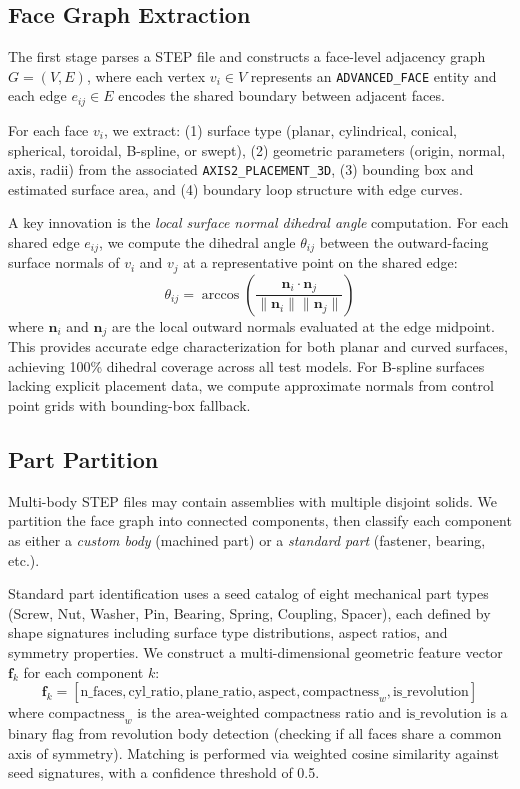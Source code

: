 \documentclass{styles/svproc}
\begin{document}
\subsection{Face Graph Extraction}
\label{sec:face_graph}
The first stage parses a STEP file and constructs a face-level adjacency graph $G = (V, E)$, where each vertex $v_i \in V$ represents an \texttt{ADVANCED\_FACE} entity and each edge $e_{ij} \in E$ encodes the shared boundary between adjacent faces.

For each face $v_i$, we extract: (1) surface type (planar, cylindrical, conical, spherical, toroidal, B-spline, or swept), (2) geometric parameters (origin, normal, axis, radii) from the associated \texttt{AXIS2\_PLACEMENT\_3D}, (3) bounding box and estimated surface area, and (4) boundary loop structure with edge curves.

A key innovation is the \emph{local surface normal dihedral angle} computation. For each shared edge $e_{ij}$, we compute the dihedral angle $\theta_{ij}$ between the outward-facing surface normals of $v_i$ and $v_j$ at a representative point on the shared edge:
\begin{equation}
\theta_{ij} = \arccos\left(\frac{\mathbf{n}_i \cdot \mathbf{n}_j}{\|\mathbf{n}_i\| \|\mathbf{n}_j\|}\right)
\label{eq:dihedral}
\end{equation}
where $\mathbf{n}_i$ and $\mathbf{n}_j$ are the local outward normals evaluated at the edge midpoint. This provides accurate edge characterization for both planar and curved surfaces, achieving 100\% dihedral coverage across all test models. For B-spline surfaces lacking explicit placement data, we compute approximate normals from control point grids with bounding-box fallback.

\subsection{Part Partition}
\label{sec:partition}
Multi-body STEP files may contain assemblies with multiple disjoint solids. We partition the face graph into connected components, then classify each component as either a \emph{custom body} (machined part) or a \emph{standard part} (fastener, bearing, etc.).

Standard part identification uses a seed catalog of eight mechanical part types (Screw, Nut, Washer, Pin, Bearing, Spring, Coupling, Spacer), each defined by shape signatures including surface type distributions, aspect ratios, and symmetry properties. We construct a multi-dimensional geometric feature vector $\mathbf{f}_k$ for each component $k$:
\begin{equation}
\mathbf{f}_k = [\text{n\_faces}, \text{cyl\_ratio}, \text{plane\_ratio}, \text{aspect}, \text{compactness}_w, \text{is\_revolution}]
\end{equation}
where $\text{compactness}_w$ is the area-weighted compactness ratio and $\text{is\_revolution}$ is a binary flag from revolution body detection (checking if all faces share a common axis of symmetry). Matching is performed via weighted cosine similarity against seed signatures, with a confidence threshold of 0.5.
\end{document}
